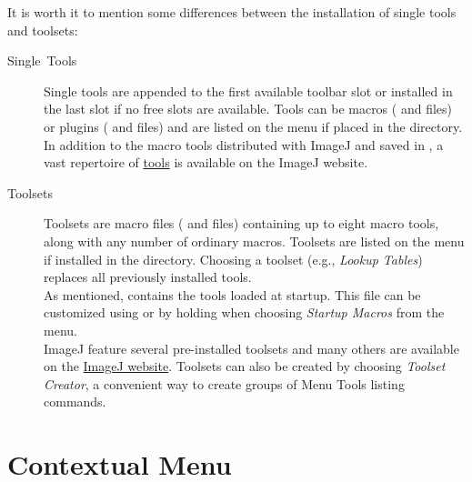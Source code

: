 It is worth it to mention some differences between the installation
of single tools and toolsets:
\begin{description}
\item [{Single\ Tools\label{misc:CustomSingleTools}}] 
Single tools are appended to the first available toolbar slot or installed
in the last slot if no free slots are available. Tools can be macros
( and  files) or  \negthinspace{}\negthinspace{}plugins
( and  files) and are listed
on the  menu if placed in the 
directory. In addition to the macro tools distributed with ImageJ
and saved in , a vast repertoire
of \href{http://imagej.nih.gov/ij/plugins/index.html\#tools}{tools}
is available on the ImageJ website.
\item [{Toolsets\label{misc:Toolsets}}] Toolsets are
macro files ( and  files) containing
up to eight macro tools, along with any number of ordinary macros.
Toolsets are listed on the  menu if installed
in the  directory. Choosing a
toolset (e.g., \emph{Lookup Tables}) replaces all previously installed
tools. \\
As mentioned, 
contains the tools loaded at startup. This file can be customized
using 
or by holding  when choosing \emph{Startup Macros}
from the  menu. \\
ImageJ feature several pre-installed toolsets \cite{C-Toolsets} and
many others are available on the \href{http://imagej.nih.gov/ij/plugins/index.html\#toolsets}{ImageJ website}.
Toolsets can also be created by choosing \emph{Toolset Creator}, a
convenient way to create groups of Menu Tools listing 
commands.
\end{description}



\section[Contextual Menu]{Contextual Menu\label{sec:ContextualMenu}}

